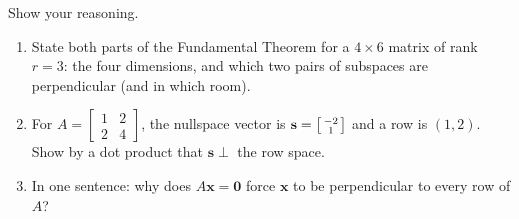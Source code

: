 \documentclass[10pt]{article}
\newcommand{\xx}{\mathbf{x}}
\newcommand{\svec}{\mathbf{s}}
\newcommand{\zero}{\mathbf{0}}
\begin{document}
\begin{practicebox}
Show your reasoning.
\begin{enumerate}[leftmargin=1.6em, itemsep=2pt]
  \item State both parts of the Fundamental Theorem for a $4\times 6$ matrix of rank $r=3$: the four dimensions, and which two pairs of subspaces are perpendicular (and in which room). \writeline
  \item For $A=\begin{bmatrix} 1 & 2 \\ 2 & 4 \end{bmatrix}$, the nullspace vector is $\svec=\begin{bsmallmatrix} -2\\1 \end{bsmallmatrix}$ and a row is $(1,2)$. Show by a dot product that $\svec\perp$ the row space. \writeline
  \item In one sentence: why does $A\xx=\zero$ force $\xx$ to be perpendicular to every row of $A$? \writeline
\end{enumerate}
\end{practicebox}
\end{document}
